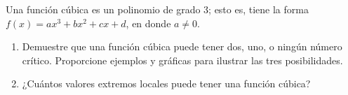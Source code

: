\item Una función cúbica es un polinomio de grado 3; esto es, tiene la forma $f(x) = ax^3 + bx^2 + cx + d$, en donde $a \ne 0$.
    \begin{enumerate}
        \item[(a)] Demuestre que una función cúbica puede tener dos, uno, o ningún número crítico. Proporcione ejemplos y gráficas para ilustrar las tres posibilidades.
        \item[(b)] ¿Cuántos valores extremos locales puede tener una función cúbica?
    \end{enumerate}
